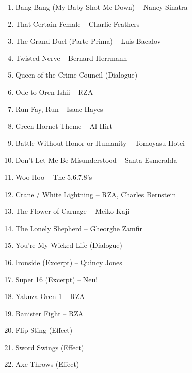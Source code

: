\documentclass[12pt]{article} %
\begin{document}
            \begin{enumerate}
                \item Bang Bang (My Baby Shot Me Down) – Nancy Sinatra
                \item That Certain Female – Charlie Feathers
                \item The Grand Duel (Parte Prima) – Luis Bacalov
                \item Twisted Nerve – Bernard Herrmann
                \item Queen of the Crime Council (Dialogue)
                \item Ode to Oren Ishii – RZA
                \item Run Fay, Run – Isaac Hayes
                \item Green Hornet Theme – Al Hirt
                \item Battle Without Honor or Humanity – Tomoyasu Hotei
                \item Don't Let Me Be Misunderstood – Santa Esmeralda
                \item Woo Hoo – The 5.6.7.8's
                \item Crane / White Lightning – RZA, Charles Bernstein
                \item The Flower of Carnage – Meiko Kaji
                \item The Lonely Shepherd – Gheorghe Zamfir
                \item You're My Wicked Life (Dialogue)
                \item Ironside (Excerpt) – Quincy Jones
                \item Super 16 (Excerpt) – Neu!
                \item Yakuza Oren 1 – RZA
                \item Banister Fight – RZA
                \item Flip Sting (Effect)
                \item Sword Swings (Effect)
                \item Axe Throws (Effect)
            \end{enumerate}

            \normalsize
\end{document}
